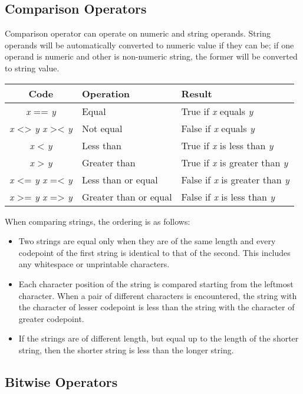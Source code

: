 \subsection{Comparison Operators}

Comparison operator can operate on numeric and string operands. String operands will be automatically converted to numeric value if they can be; if one operand is numeric and other is non-numeric string, the former will be converted to string value.

\begin{tabulary}{\textwidth}{CLL}
Code & Operation & Result \\
\hline
\emph{x} == \emph{y} & Equal & True if \emph{x} equals \emph{y} \\
\emph{x} <\!> \emph{y} \quad \emph{x} >\!< \emph{y} & Not equal & False if \emph{x} equals \emph{y} \\
\emph{x} < \emph{y} & Less than & True if \emph{x} is less than \emph{y} \\
\emph{x} > \emph{y} & Greater than & True if \emph{x} is greater than \emph{y} \\
\emph{x} <\!= \emph{y} \quad \emph{x} =\!< \emph{y} & Less than or equal & False if \emph{x} is greater than \emph{y} \\
\emph{x} >\!= \emph{y} \quad \emph{x} =\!> \emph{y} & Greater than or equal & False if \emph{x} is less than \emph{y} \\
\end{tabulary}

When comparing strings, the ordering is as follows:

\begin{itemize}
\item Two strings are equal only when they are of the same length and every codepoint of the first string is identical to that of the second. This includes any whitespace or unprintable characters. 
\item Each character position of the string is compared starting from the leftmost character. When a pair of different characters is encountered, the string with the character of lesser codepoint is less than the string with the character of greater codepoint. 
\item If the strings are of different length, but equal up to the length of the shorter string, then the shorter string is less than the longer string.
\end{itemize}

\subsection{Bitwise Operators}

